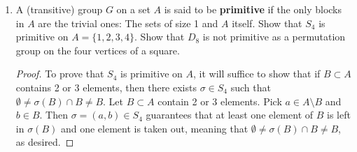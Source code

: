 \documentclass[../psets.tex]{subfiles}
\begin{document}
\begin{enumerate}
\begin{enumerate}[label={\textbf{\arabic*.}}]
\begin{enumerate}[label={\textbf{(\alph*)}}]
\begin{proof}






                To prove that the $\sigma_i(B)$ form a partition of $A$, it will suffice to show that they are pairwise disjoint and that all $a\in A$ lie in some $\sigma_i(B)$.\par
                Suppose for the sake of contradiction that there exist $1\leq i\neq j\leq n$ such that $\sigma_i(B)\cap\sigma_j(B)\neq\emptyset$. Then there exists an $a\in A$ such that $a=\sigma_ib=\sigma_jb'$ for some $b,b'\in B$. Since $\sigma_ib=\sigma_jb'$, $b=\sigma_i^{-1}\sigma_jb'$. It follows that $b\in\sigma_i^{-1}\sigma_j(B)$ and $b\in B$, so $b\in\sigma_i^{-1}\sigma_j(B)\cap B$, a contradiction.\par
                Let $a\in A$ be arbitrary, and pick some $b\in B$. Since the action is transitive, there exists $\sigma\in G$ such that $\sigma(b)=a$. Thus, $a\in\sigma(B)$. But since $\sigma_1(B),\sigma_2(B),\dots,\sigma_n(B)$ encapsulates \emph{all} distinct images of $B$ under the elements of $G$, $\sigma(B)=\sigma_i(B)$ for some $1\leq i\leq n$, as desired.
            \end{proof}
            \item A (transitive) group $G$ on a set $A$ is said to be \textbf{primitive} if the only blocks in $A$ are the trivial ones: The sets of size 1 and $A$ itself. Show that $S_4$ is primitive on $A=\{1,2,3,4\}$. Show that $D_8$ is not primitive as a permutation group on the four vertices of a square.
            \begin{proof}
                To prove that $S_4$ is primitive on $A$, it will suffice to show that if $B\subset A$ contains 2 or 3 elements, then there exists $\sigma\in S_4$ such that $\emptyset\neq\sigma(B)\cap B\neq B$. Let $B\subset A$ contain 2 or 3 elements. Pick $a\in A\setminus B$ and $b\in B$. Then $\sigma=(a,b)\in S_4$ guarantees that at least one element of $B$ is left in $\sigma(B)$ and one element is taken out, meaning that $\emptyset\neq\sigma(B)\cap B\neq B$, as desired.\par

\end{proof}
\end{enumerate}
\end{enumerate}
\end{enumerate}
\end{document}
